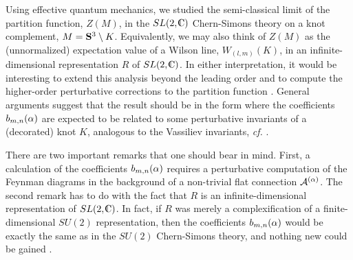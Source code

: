 
Using effective quantum mechanics, we studied the semi-classical
limit of the partition function, $Z(M)$, in the $SL(2,\IC)$
Chern-Simons theory on a knot complement, $M = \S^3 \setminus K$.
Equivalently, we may also think of $Z(M)$ as
the (unnormalized) expectation value of a Wilson line, $W_{(l,m)}(K)$,
in an infinite-dimensional representation $R$ of $SL(2,\IC)$.
In either interpretation, it would be interesting to extend
this analysis beyond the leading order and to compute
the higher-order perturbative corrections to the partition
function \semiclassz.
General arguments suggest that the result should be in the form
%
\eqn{}
%
where
the coefficients $b_{m,n} (\a)$ are expected to be related to
some perturbative invariants of a (decorated) knot $K$, analogous
to the Vassiliev invariants, {\it cf.} .

There are two important remarks that one should bear in mind.
First, a calculation of the coefficients $b_{m,n} (\a)$
requires a perturbative computation of the Feynman diagrams
in the background of a non-trivial flat connection $\CA^{(\a)}$.
The second remark has to do with the fact that $R$ is
an infinite-dimensional representation of $SL(2,\IC)$.
In fact, if $R$ was merely a complexification of
a finite-dimensional $SU(2)$ representation,
then the coefficients $b_{m,n} (\a)$ would be exactly
the same as in the $SU(2)$ Chern-Simons theory,
and nothing new could be gained \DrorVas.




